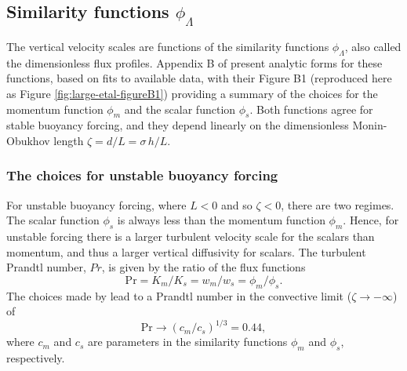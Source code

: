 \subsection{Similarity functions $\phi_{\Lambda}$}
\label{subsection:similarity-functions}

The vertical velocity scales are functions of the similarity functions
$\phi_{\Lambda}$, also called the dimensionless flux profiles.
Appendix B of \cite{LargeKPP} present analytic forms for these
functions, based on fits to available data, with their Figure B1
(reproduced here as Figure \ref{fig:large-etal-figureB1}) providing a
summary of the choices for the momentum function $\phi_{m}$ and the
scalar function $\phi_{s}$.  Both functions agree for stable buoyancy
forcing, and they depend linearly on the dimensionless Monin-Obukhov
length $\zeta = d/L = \sigma \, h/L$.


\subsubsection{The \cite{LargeKPP} choices for unstable buoyancy forcing}

For unstable buoyancy forcing, where $L<0$ and so $\zeta < 0$, there
are two regimes.  The scalar function $\phi_{s}$ is always less than
the momentum function $\phi_{m}$.  Hence, for unstable forcing there
is a larger turbulent velocity scale for the scalars than momentum,
and thus a larger vertical diffusivity for scalars.  The turbulent
Prandtl number, $Pr$, is given by the ratio of the flux functions
\begin{equation}
  \mbox{Pr} = K_{m} / K_{s} = w_{m} / w_{s} = \phi_{m} / \phi_{s}.
\label{eq:prandtl-number}
\end{equation}
The choices made by \cite{LargeKPP} lead to a Prandtl number in the
convective limit ($\zeta \rightarrow -\infty$) of 
\begin{equation}
 \mbox{Pr}  \rightarrow (c_{m}/c_{s})^{1/3} = 0.44,
\label{eq:convective-limit-prandtl}
\end{equation}
where $c_{m}$ and $c_{s}$ are parameters in the similarity functions
$\phi_{m}$ and $\phi_{s}$, respectively.

